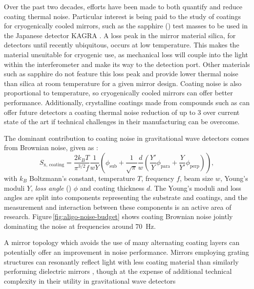 Over the past two decades, efforts have been made to both quantify and reduce coating thermal noise. Particular interest is being paid to the study of coatings for cryogenically cooled mirrors, such as the sapphire () test masses to be used in the Japanese detector \gls{KAGRA} \cite{Somiya2012}. A loss peak in the mirror material silica, for detectors until recently ubiquitous, occurs at low temperature. This makes the material unsuitable for cryogenic use, as mechanical loss will couple into the light within the interferometer and make its way to the detection port. Other materials such as sapphire do not feature this loss peak and provide lower thermal noise than silica at room temperature for a given mirror design. Coating noise is also proportional to temperature, so cryogenically cooled mirrors can offer better performance. Additionally, crystalline coatings made from compounds such as  can offer future detectors a coating thermal noise reduction of up to 3 over current state of the art \cite{Cole2013} if technical challenges in their manufacturing can be overcome.

The dominant contribution to coating noise in gravitational wave detectors comes from Brownian noise, given as \cite{Harry2002}:
\begin{equation}
  S_{\text{x, coating}} = \frac{2 k_B T}{\pi^{3/2} f} \frac{1}{w Y} \left( \phi_{\text{sub}} + \frac{1}{\sqrt{\pi}} \frac{d}{w} \left( \frac{Y'}{Y} \phi_{\text{para}} + \frac{Y}{Y'} \phi_{\text{perp}} \right) \right),
\end{equation}
with $k_B$ Boltzmann's constant, temperature $T$, frequency $f$, beam size $w$, Young's moduli $Y$, \emph{loss angle} () $\phi$ and coating thickness $d$. The Young's moduli and loss angles are split into components representing the substrate and coatings, and the measurement and interaction between these components is an active area of research. Figure\,\ref{fig:aligo-noise-budget} shows coating Brownian noise jointly dominating the noise at frequencies around \SI{70}{\hertz}.

A mirror topology which avoids the use of many alternating coating layers can potentially offer an improvement in noise performance. Mirrors employing grating structures can resonantly reflect light with less coating material than similarly performing dielectric mirrors \cite{Mashev1985}, though at the expense of additional technical complexity in their utility in gravitational wave detectors \cite{Leavey2015}

